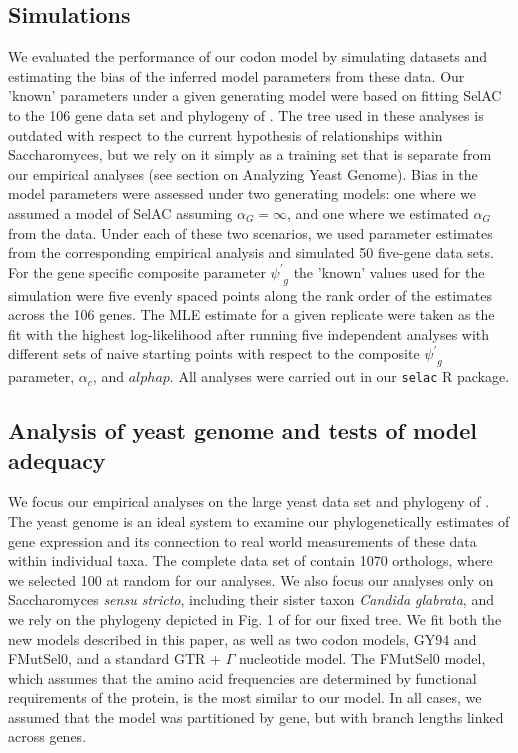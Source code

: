 \documentclass{article}
\newcommand{\alphac}{\ensuremath{\alpha_c}\xspace}
\newcommand{\alphag}{\ensuremath{\alpha_G}\xspace}
\newcommand{\psiprime}{\ensuremath{\psi^\prime}\xspace}
\begin{document}
\subsection*{Simulations}
We evaluated the performance of our codon model by simulating datasets and estimating the bias of the inferred model parameters from these data.
Our 'known' parameters under a given generating model were based on fitting SelAC to the 106 gene data set and phylogeny of \citet{RokasEtAl2003}.
The tree used in these analyses is outdated with respect to the current hypothesis of relationships within Saccharomyces, but we rely on it simply as a training set that is separate from our empirical analyses (see section on Analyzing Yeast Genome).
Bias in the model parameters were assessed under two generating models: one where we assumed a model of SelAC assuming $\alphag = \infty$, and one where we estimated $\alphag$ from the data.
Under each of these two scenarios, we used parameter estimates from the corresponding empirical analysis and simulated 50 five-gene data sets.
For the gene specific composite parameter $\psiprime_g$ the 'known' values used for the simulation were five evenly spaced points along the rank order of the estimates across the 106 genes.
The MLE estimate for a given replicate were taken as the fit with the highest log-likelihood after running five independent analyses with different sets of naive starting points with respect to the composite $\psiprime_g$ parameter, $\alphac$, and $alphap$.
All analyses were carried out in our \texttt{selac} R package.

\subsection*{Analysis of yeast genome and tests of model adequacy}
We focus our empirical analyses on the large yeast data set and phylogeny of \citet{SalichosAndRokas2013}.
The yeast genome is an ideal system to examine our phylogenetically estimates of gene expression and its connection to real world measurements of these data within individual taxa.
The complete data set of \citet{SalichosAndRokas2013} contain 1070 orthologs, where we selected 100 at random for our analyses.
We also focus our analyses only on Saccharomyces \emph{sensu stricto}, including their sister taxon \emph{Candida glabrata}, and we rely on the phylogeny depicted in Fig. 1 of \citet{SalichosAndRokas2013} for our fixed tree.
We fit both the new models described in this paper, as well as two codon models, GY94 and FMutSel0, and a standard GTR + $\Gamma$ nucleotide model.
The FMutSel0 model, which assumes that the amino acid frequencies are determined by functional requirements of the protein, is the most similar to our model. 
In all cases, we assumed that the model was partitioned by gene, but with branch lengths linked across genes.
\end{document}
